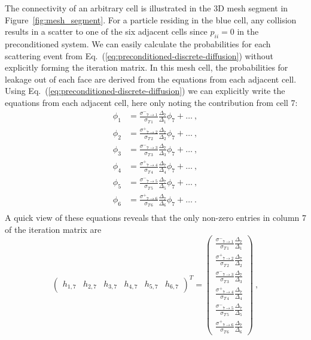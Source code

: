 \documentclass[preprint,12pt]{elsarticle}
\newcommand{\sigm}{\ensuremath{\sigma^{-}}}
\newcommand{\sigp}{\ensuremath{\sigma^{+}}}
\begin{document}
The connectivity of an arbitrary cell is illustrated in the 3D mesh segment in
Figure~\ref{fig:mesh_segment}.  For a particle residing in the blue cell, any
collision results in a scatter to one of the six adjacent cells since
$p_{ii}=0$ in the preconditioned system.  We can easily calculate the
probabilities for each scattering event from
Eq.~(\ref{eq:preconditioned-discrete-diffusion}) without explicitly forming
the iteration matrix.  In this mesh cell, the probabilities for leakage out of
each face are derived from the equations from each adjacent cell.  Using
Eq.~(\ref{eq:preconditioned-discrete-diffusion}) we can explicitly write the
equations from each adjacent cell, here only noting the contribution from cell
7:
\begin{align*}
  \phi_1 &= \frac{\sigm_{7\rightarrow 1}}{\sigma_{T\,1}}
  \frac{\Delta_7}{\Delta_1}\phi_7 + \ldots\:,\\ 
  \phi_2 &= \frac{\sigp_{7\rightarrow 2}}
  {\sigma_{T\,2}}\frac{\Delta_7}{\Delta_2}\phi_7 + \ldots\:,\\
  \phi_3 &= \frac{\sigm_{7\rightarrow 3}}{\sigma_{T\,3}}
  \frac{\Delta_7}{\Delta_3}\phi_7 + \ldots\:,\\ 
  \phi_4 &= \frac{\sigp_{7\rightarrow 4}}{\sigma_{T\,4}}
  \frac{\Delta_7}{\Delta_4}\phi_7 + \ldots\:,\\
  \phi_5 &= \frac{\sigm_{7\rightarrow 5}}{\sigma_{T\,5}}
  \frac{\Delta_7}{\Delta_5}\phi_7 + \ldots\:,\\
  \phi_6 &= \frac{\sigp_{7\rightarrow 6}}{\sigma_{T\,6}}
  \frac{\Delta_7}{\Delta_6}\phi_7 + \ldots\:.\\ 
\end{align*} 
A quick view of these equations reveals that the only non-zero entries in
column 7 of the iteration matrix are
\begin{equation*}
  \begin{pmatrix}
    h_{1,7} & h_{2,7} & h_{3,7} & h_{4,7} & h_{5,7} & h_{6,7}
  \end{pmatrix}^{T}
  =
  \begin{pmatrix}
    \frac{\sigm_{7\rightarrow
        1}}{\sigma_{T\,1}}\frac{\Delta_7}{\Delta_1}
    \\ \frac{\sigp_{7\rightarrow
        2}}{\sigma_{T\,2}}\frac{\Delta_7}{\Delta_2}
    \\ \frac{\sigm_{7\rightarrow
        3}}{\sigma_{T\,3}}\frac{\Delta_7}{\Delta_3}
    \\ \frac{\sigp_{7\rightarrow
        4}}{\sigma_{T\,4}}\frac{\Delta_7}{\Delta_4}
    \\ \frac{\sigm_{7\rightarrow
        5}}{\sigma_{T\,5}}\frac{\Delta_7}{\Delta_5}
    \\ \frac{\sigp_{7\rightarrow
        6}}{\sigma_{T\,6}}\frac{\Delta_7}{\Delta_6}
  \end{pmatrix}\:,
\end{equation*}
\end{document}
